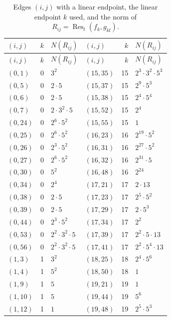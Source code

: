 \documentclass[11pt]{article}
\begin{document}
\begingroup\small
\setlength{\LTcapwidth}{\textwidth}
\begin{longtable}{@{}lrl@{\qquad}lrl@{}}
\caption{Edges $(i,j)$ with a linear endpoint, the linear endpoint $k$ used, and the norm of $R_{ij}=\operatorname{Res}_t(f_k,g_{kl})$.}\label{tab:csep}\\
\hline $(i,j)$ & $k$ & $N(R_{ij})$ & $(i,j)$ & $k$ & $N(R_{ij})$\\\hline\endfirsthead\hline $(i,j)$ & $k$ & $N(R_{ij})$ & $(i,j)$ & $k$ & $N(R_{ij})$\\\hline\endhead\hline\endfoot
$(0,1)$ & 0 & $3^{2}$ & $(15,35)$ & 15 & $2^{3}\cdot 3^{2}\cdot 5^{3}$\\
$(0,5)$ & 0 & $2\cdot 5$ & $(15,37)$ & 15 & $2^{9}\cdot 5^{3}$\\
$(0,6)$ & 0 & $2\cdot 5$ & $(15,38)$ & 15 & $2^{4}\cdot 5^{4}$\\
$(0,7)$ & 0 & $2\cdot 3^{2}\cdot 5$ & $(15,52)$ & 15 & $2^{4}$\\
$(0,24)$ & 0 & $2^{6}\cdot 5^{2}$ & $(15,55)$ & 15 & $1$\\
$(0,25)$ & 0 & $2^{6}\cdot 5^{2}$ & $(16,23)$ & 16 & $2^{19}\cdot 5^{2}$\\
$(0,26)$ & 0 & $2^{3}\cdot 5^{2}$ & $(16,31)$ & 16 & $2^{27}\cdot 5^{2}$\\
$(0,27)$ & 0 & $2^{6}\cdot 5^{2}$ & $(16,32)$ & 16 & $2^{31}\cdot 5$\\
$(0,30)$ & 0 & $5^{2}$ & $(16,48)$ & 16 & $2^{24}$\\
$(0,34)$ & 0 & $2^{4}$ & $(17,21)$ & 17 & $2\cdot 13$\\
$(0,38)$ & 0 & $2\cdot 5$ & $(17,23)$ & 17 & $2^{5}\cdot 5^{2}$\\
$(0,39)$ & 0 & $2\cdot 5$ & $(17,29)$ & 17 & $2\cdot 5^{3}$\\
$(0,44)$ & 0 & $2^{3}\cdot 5^{2}$ & $(17,34)$ & 17 & $2^{2}$\\
$(0,53)$ & 0 & $2^{2}\cdot 3^{2}\cdot 5$ & $(17,39)$ & 17 & $2^{2}\cdot 5\cdot 13$\\
$(0,56)$ & 0 & $2^{2}\cdot 3^{2}\cdot 5$ & $(17,41)$ & 17 & $2^{2}\cdot 5^{4}\cdot 13$\\
$(1,3)$ & 1 & $3^{2}$ & $(18,25)$ & 18 & $2^{4}\cdot 5^{6}$\\
$(1,4)$ & 1 & $5^{2}$ & $(18,50)$ & 18 & $1$\\
$(1,9)$ & 1 & $5$ & $(19,21)$ & 19 & $1$\\
$(1,10)$ & 1 & $5$ & $(19,44)$ & 19 & $5^{6}$\\
$(1,12)$ & 1 & $1$ & $(19,48)$ & 19 & $2^{5}\cdot 5^{3}$\\

\end{longtable}
\end{document}
